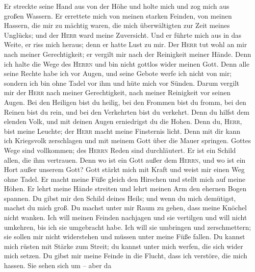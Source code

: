 Er streckte seine Hand aus von der Höhe und holte mich
und zog mich aus großen Wassern.  Er errettete mich von
meinen starken Feinden, von meinen Hassern, die mir zu mächtig waren,
 die mich überwältigten zur Zeit meines Unglücks; und der
\textsc{Herr} ward meine Zuversicht.  Und er führte mich
aus in das Weite, er riss mich heraus; denn er hatte Lust zu mir.
 Der \textsc{Herr} tut wohl an mir nach meiner
Gerechtigkeit; er vergilt mir nach der Reinigkeit meiner Hände.
 Denn ich halte die Wege des \textsc{Herrn} und bin nicht
gottlos wider meinen Gott.  Denn alle seine Rechte habe
ich vor Augen, und seine Gebote werfe ich nicht von mir; 
sondern ich bin ohne Tadel vor ihm und hüte mich vor Sünden.
 Darum vergilt mir der \textsc{Herr} nach meiner
Gerechtigkeit, nach meiner Reinigkeit vor seinen Augen. 
Bei den Heiligen bist du heilig, bei den Frommen bist du fromm,
 bei den Reinen bist du rein, und bei den Verkehrten bist
du verkehrt.  Denn du hilfst dem elenden Volk, und mit
deinen Augen erniedrigst du die Hohen.  Denn du,
\textsc{Herr}, bist meine Leuchte; der \textsc{Herr} macht meine
Finsternis licht.  Denn mit dir kann ich Kriegsvolk
zerschlagen und mit meinem Gott über die Mauer springen. 
Gottes Wege sind vollkommen; des \textsc{Herrn} Reden sind durchläutert.
Er ist ein Schild allen, die ihm vertrauen.  Denn wo ist
ein Gott außer dem \textsc{Herrn}, und wo ist ein Hort außer unserem
Gott?  Gott stärkt mich mit Kraft und weist mir einen Weg
ohne Tadel.  Er macht meine Füße gleich den Hirschen und
stellt mich auf meine Höhen.  Er lehrt meine Hände
streiten und lehrt meinen Arm den ehernen Bogen spannen. 
Du gibst mir den Schild deines Heils; und wenn du mich demütigst, machst
du mich groß.  Du machst unter mir Raum zu gehen, dass
meine Knöchel nicht wanken.  Ich will meinen Feinden
nachjagen und sie vertilgen und will nicht umkehren, bis ich sie
umgebracht habe.  Ich will sie umbringen und
zerschmettern; sie sollen mir nicht widerstehen und müssen unter meine
Füße fallen.  Du kannst mich rüsten mit Stärke zum
Streit; du kannst unter mich werfen, die sich wider mich setzen.
 Du gibst mir meine Feinde in die Flucht, dass ich
verstöre, die mich hassen.  Sie sehen sich um -- aber da

